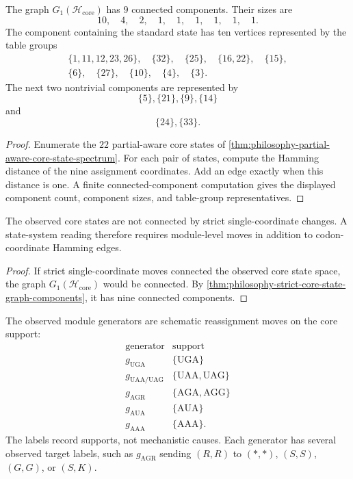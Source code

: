 \begin{theorem}
\label{thm:philosophy-strict-core-state-graph-components}
The graph $G_{1}(\mathcal H_{\mathrm{core}})$ has $9$ connected
components. Their sizes are
$$
  10,\quad 4,\quad 2,\quad 1,\quad 1,\quad 1,\quad 1,\quad 1,\quad 1.
$$
The component containing the standard state has ten vertices represented
by the table groups
$$
\begin{gathered}
  \{1,11,12,23,26\},\quad
  \{32\},\quad
  \{25\},\quad
  \{16,22\},\quad
  \{15\},\\
  \{6\},\quad
  \{27\},\quad
  \{10\},\quad
  \{4\},\quad
  \{3\}.
\end{gathered}
$$
The next two nontrivial components are represented by
$$
  \{5\},\{21\},\{9\},\{14\}
$$
and
$$
  \{24\},\{33\}.
$$
\end{theorem}
\begin{proof}
Enumerate the $22$ partial-aware core states of
\autoref{thm:philosophy-partial-aware-core-state-spectrum}. For each
pair of states, compute the Hamming distance of the nine assignment
coordinates. Add an edge exactly when this distance is one. A finite
connected-component computation gives the displayed component count,
component sizes, and table-group representatives.
\end{proof}

\begin{corollary}
\label{cor:philosophy-single-coordinate-dynamics-insufficient}
The observed core states are not connected by strict single-coordinate
changes. A state-system reading therefore requires module-level moves in
addition to codon-coordinate Hamming edges.
\end{corollary}
\begin{proof}
If strict single-coordinate moves connected the observed core state
space, the graph $G_{1}(\mathcal H_{\mathrm{core}})$ would be connected.
By \autoref{thm:philosophy-strict-core-state-graph-components}, it has
nine connected components.
\end{proof}

\begin{definition}
\label{def:philosophy-observed-module-generators}
The observed module generators are schematic reassignment moves on the
core support:
$$
\begin{array}{c|c}
  \text{generator} & \text{support}\\
\hline
  g_{\mathrm{UGA}} & \{\mathrm{UGA}\}\\
  g_{\mathrm{UAA/UAG}} & \{\mathrm{UAA},\mathrm{UAG}\}\\
  g_{\mathrm{AGR}} & \{\mathrm{AGA},\mathrm{AGG}\}\\
  g_{\mathrm{AUA}} & \{\mathrm{AUA}\}\\
  g_{\mathrm{AAA}} & \{\mathrm{AAA}\}.
\end{array}
$$
The labels record supports, not mechanistic causes. Each generator has
several observed target labels, such as $g_{\mathrm{AGR}}$ sending
$(R,R)$ to $(*,*)$, $(S,S)$, $(G,G)$, or $(S,K)$.
\end{definition}

